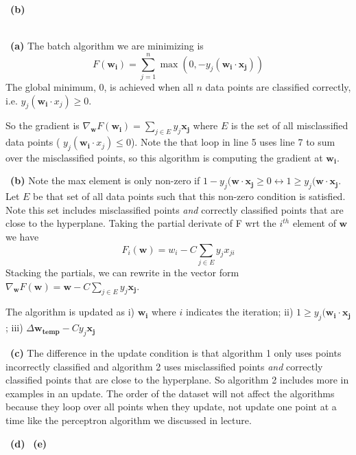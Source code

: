 \documentclass[a4 paper, 15pt]{article}
\numberwithin{equation}{section}
\newcommand{\problem}[1]{~\\\fbox{\textbf{Problem #1}}\newline\newline}
\newcommand{\subproblem}[1]{~\newline\textbf{(#1)}}
\begin{document}
\subproblem{b}

\newpage
\problem{3}
\subproblem{a} The batch algorithm we are minimizing is \begin{equation*}
F(\mathbf{w_{i}}) = \sum_{j=1}^{n}\max(0, -y_{j}(\mathbf{w_{i}}\cdot \mathbf{x_{j}}))
\end{equation*}
The global minimum, 0, is achieved when all $n$ data points are classified correctly, i.e. $ y_{j}(\mathbf{w_{i}}\cdot x_{j}) \geq 0 $.
\par
So the gradient is $\nabla_{\mathbf{w}} F(\mathbf{w_{i}})= \sum_{j\in E}^{} y_{j}\mathbf{x_{j}} $ where $E$ is the set of all misclassified data points ( $y_{j}(\mathbf{w_{i}}\cdot x_{j}) \leq 0$). Note the that loop in line 5 uses line 7 to sum over the misclassified points, so this algorithm is computing the gradient at $\mathbf{w_{i}}$.
\par
\subproblem{b} Note the max element is only non-zero if $ 1 - y_{j}(\mathbf{w}\cdot \mathbf{x_{j}} \geq 0 \leftrightarrow 1 \geq y_{j}(\mathbf{w}\cdot \mathbf{x_{j}}$.  Let $E$ be that set of all data points such that this non-zero condition is satisfied.  Note this set includes misclassified points \textit{and} correctly classified points that are close to the hyperplane.  Taking the partial derivate of F wrt the $i^{th}$ element of $\mathbf{w}$ we have \begin{equation*}
F_{i}(\mathbf{w}) = w_{i} - C \sum_{j\in E} y_{j}x_{ji}
\end{equation*}
Stacking the partials, we can rewrite in the vector form $ \nabla_{\mathbf{w}} F(\mathbf{w}) = \mathbf{w} - C \sum_{j\in E} y_{j}\mathbf{x_{j}} $.
\par
The algorithm is updated as i) $\mathbf{w_{i}}$ where $i$ indicates the iteration; ii) $ 1 \geq y_{j}(\mathbf{w_{i}}\cdot \mathbf{x_{j}}$; iii) $\Delta\mathbf{w_{temp}} - Cy_{j}\mathbf{x_{j}} $
\par
\subproblem{c} The difference in the update condition is that algorithm 1 only uses points incorrectly classified and algorithm 2 uses misclassified points \textit{and} correctly classified points that are close to the hyperplane. So algorithm 2 includes more in examples in an update.  The order of the dataset will not affect the algorithms because they loop over all points when they update, not update one point at a time like the perceptron algorithm we discussed in lecture.
\par
\subproblem{d}
\subproblem{e}
\end{document}
